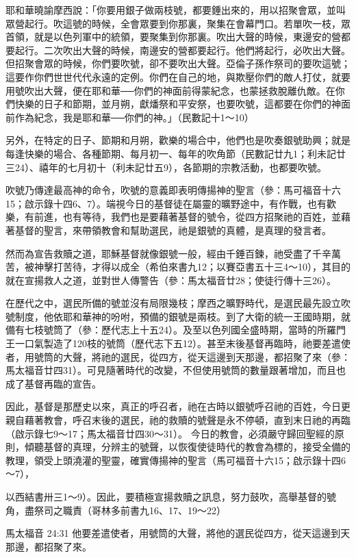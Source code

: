 耶和華曉諭摩西說：「你要用銀子做兩枝號，都要錘出來的，用以招聚會眾，並叫眾營起行。吹這號的時候，全會眾要到你那裏，聚集在會幕門口。若單吹一枝，眾首領，就是以色列軍中的統領，要聚集到你那裏。吹出大聲的時候，東邊安的營都要起行。二次吹出大聲的時候，南邊安的營都要起行。他們將起行，必吹出大聲。但招聚會眾的時候，你們要吹號，卻不要吹出大聲。亞倫子孫作祭司的要吹這號；這要作你們世世代代永遠的定例。你們在自己的地，與欺壓你們的敵人打仗，就要用號吹出大聲，便在耶和華──你們的神面前得蒙紀念，也蒙拯救脫離仇敵。在你們快樂的日子和節期，並月朔，獻燔祭和平安祭，也要吹號，這都要在你們的神面前作為紀念，我是耶和華──你們的神。」（民數記十1～10）


另外，在特定的日子、節期和月朔，歡樂的場合中，他們也是吹奏銀號助興；就是每逢快樂的場合、各種節期、每月初一、每年的吹角節（民數記廿九1；利未記廿三24）、禧年的七月初十（利未記廿五9），各節期的宗教活動，也都要吹號。


吹號乃傳達最高神的命令，吹號的意義即表明傳揚神的聖言（參：馬可福音十六15；啟示錄十四6、7）。端視今日的基督徒在屬靈的曠野途中，有作戰，也有歡樂，有前進，也有等待，我們也是要藉著基督的號令，從四方招聚祂的百姓，並藉著基督的聖言，來帶領教會和幫助選民，祂是銀號的真體，是真理的發言者。

然而為宣告救贖之道，耶穌基督就像銀號一般，經由千錘百鍊，祂受盡了千辛萬苦，被神擊打苦待，才得以成全（希伯來書九12；以賽亞書五十三4～10），其目的就在宣揚救人之道，並對世人傳警告（參：馬太福音廿28；使徒行傳十三26）。


在歷代之中，選民所備的號並沒有局限幾枝；摩西之曠野時代，是選民最先設立吹號制度，他依耶和華神的吩咐，預備的銀號是兩枝。到了大衛的統一王國時期，就備有七枝號筒了（參：歷代志上十五24）。及至以色列國全盛時期，當時的所羅門王一口氣製造了120枝的號筒（歷代志下五12）。甚至末後基督再臨時，祂要差遣使者，用號筒的大聲，將祂的選民，從四方，從天這邊到天那邊，都招聚了來（參：馬太福音廿四31）。可見隨著時代的改變，不但使用號筒的數量跟著增加，而且也成了基督再臨的宣告。

因此，基督是那歷史以來，真正的呼召者，祂在古時以銀號呼召祂的百姓，今日更親自藉著教會，呼召末後的選民，祂的救贖的號聲是永不停頓，直到末日祂的再臨（啟示錄七9～17；馬太福音廿四30～31）。
今日的教會，必須嚴守歸回聖經的原則，傾聽基督的真理，分辨主的號聲，以恢復使徒時代的教會為標的，接受全備的教理，領受上頭澆灌的聖靈，確實傳揚神的聖言（馬可福音十六15；啟示錄十四6～7），

以西結書卅三1～9）。因此，要積極宣揚救贖之訊息，努力鼓吹，高舉基督的號角，盡祭司之職責（哥林多前書九16、17、19～22）

馬太福音 24:31
他要差遣使者，用號筒的大聲，將他的選民從四方，從天這邊到天那邊，都招聚了來。

